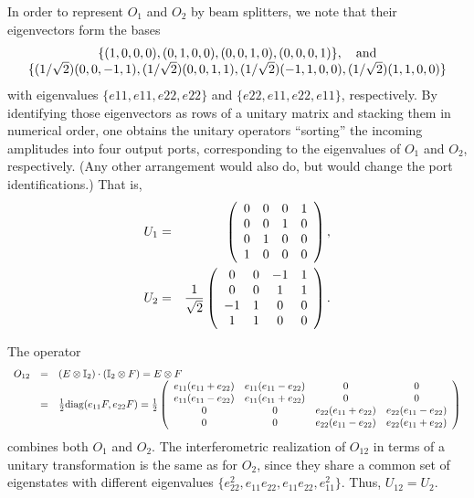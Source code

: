 \documentclass[pra,preprint,showpacs,showkeys,amsfonts]{revtex4}
\begin{document}
In order to represent $O_1$ and $O_2$ by beam splitters,
we note that their eigenvectors form the bases
\begin{equation}
\begin{array}{c}
\{(1, 0, 0, 0), (0, 1, 0, 0), (0, 0, 1, 0),  (0, 0, 0, 1)\},\quad {\rm and}\\
\{(1/ \sqrt{2})(0, 0, -1, 1),(1/ \sqrt{2})(0, 0, 1, 1),  (1/ \sqrt{2})(-1, 1, 0, 0), (1/ \sqrt{2})(1, 1, 0, 0)\}
\end{array}
\end{equation}
with eigenvalues
$\{e11, e11, e22, e22\}$
and
$\{e22, e11, e22, e11\}$, respectively.
By identifying those eigenvectors as rows of a unitary
matrix and stacking them in numerical order, one obtains the
unitary operators ``sorting'' the incoming
amplitudes into four output ports, corresponding to the eigenvalues
of $O_1$ and $O_2$, respectively.
(Any other arrangement would also do, but would change the port identifications.)
That is,
\begin{eqnarray}
U_1 & = &
\left(
\begin{array}{cccc}
0&0&0&1\\
0&0&1&0\\
0&1&0&0\\
1&0&0&0
\end{array}
\right)
,    \label{2004-analog-ea1}
\\
U_2 & = & {1\over  \sqrt{2}}
\left(
\begin{array}{cccc}
0& 0& -1& 1\\
0& 0& 1& 1\\
-1& 1& 0& 0    \\
1& 1& 0& 0
\end{array}
\right)   \label{2004-analog-ea2}
.
\end{eqnarray}

The operator
\begin{equation}
\begin{array}{lll}
O_{12}&=&(E\otimes {\Bbb I}_2)\cdot ({\Bbb I}_2\otimes F)
=E\otimes F \\
&=&
{1\over {2}}
{\rm diag}(e_{11} F, e_{22} F) =
{1\over  {2}}
\left(
\begin{array}{cccc}
e_{11} (e_{11} + e_{22})& e_{11} (e_{11} - e_{22})& 0& 0\\
e_{11} (e_{11} - e_{22})& e_{11} (e_{11} + e_{22})& 0& 0\\
0& 0& e_{22} (e_{11} + e_{22})&  e_{22}(e_{11} - e_{22})\\
0& 0&  e_{22}(e_{11} - e_{22})& e_{22} (e_{11} + e_{22})
\end{array}
\right)
\end{array} \label{2004-analog-u12}
\end{equation}
combines both $O_1$ and $O_2$.
The interferometric realization of $O_{12}$ in terms of a unitary transformation
is the same as for $O_2$, since they share a common set of eigenstates
with different eigenvalues
$\{e_{22}^2,  e_{11} e_{22},  e_{11} e_{22},  e_{11}^2\}$. Thus,
$U_{12} =U_2$.
\end{document}
